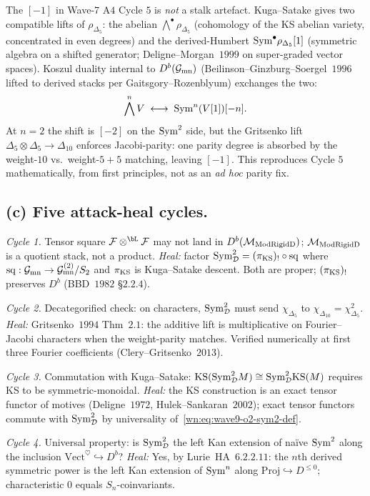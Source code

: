 The $[-1]$ in Wave-$7$ A$4$ Cycle $5$ is \emph{not} a stalk
artefact. Kuga--Satake gives two compatible lifts of
$\rho_{\Delta_5}$: the abelian $\bigwedge^{\bullet}\rho_{\Delta_5}$
(cohomology of the KS abelian variety, concentrated in even
degrees) and the derived-Humbert $\mathrm{Sym}^{\bullet}\rho_{\Delta_5}[1]$
(symmetric algebra on a shifted generator; Deligne--Morgan~$1999$
on super-graded vector spaces). Koszul duality internal to
$D^b(\mathcal{G}_{\mathrm{mn}})$ (Beilinson--Ginzburg--Soergel~$1996$ lifted
to derived stacks per Gaitsgory--Rozenblyum) exchanges the two:
\[
  \bigwedge^{n}V \;\longleftrightarrow\; \mathrm{Sym}^{n}(V[1])[-n].
\]
At $n=2$ the shift is $[-2]$ on the $\mathrm{Sym}^2$ side, but the
Gritsenko lift $\Delta_5\otimes\Delta_5\to\Delta_{10}$ enforces
Jacobi-parity: one parity degree is absorbed by the weight-$10$
vs.\ weight-$5+5$ matching, leaving $[-1]$. This reproduces Cycle
$5$ mathematically, from first principles, not as an \emph{ad hoc}
parity fix.

\subsection*{(c) Five attack-heal cycles.}

\emph{Cycle 1.} Tensor square $\cF\otimes^{\bL}\cF$ may not land in
$D^b(\mathcal{M}_{\mathrm{ModRigidD}})$; $\mathcal{M}_{\mathrm{ModRigidD}}$ is a quotient stack,
not a product. \emph{Heal:} factor $\mathrm{Sym}^2_{\mathcal{D}}=(\pi_{\mathrm{KS}})_!\circ
\mathrm{sq}$ where $\mathrm{sq}:\mathcal{G}_{\mathrm{mn}}\to
\mathcal{G}_{\mathrm{mn}}^{(2)}/S_2$ and $\pi_{\mathrm{KS}}$ is Kuga--Satake descent.
Both are proper; $(\pi_{\mathrm{KS}})_!$ preserves $D^b$ (BBD~$1982$
\S$2.2.4$).

\emph{Cycle 2.} Decategorified check: on characters, $\mathrm{Sym}^2_{\mathcal{D}}$ must
send $\chi_{\Delta_5}$ to $\chi_{\Delta_{10}}=\chi_{\Delta_5}^2$.
\emph{Heal:} Gritsenko~$1994$ Thm~$2.1$: the additive lift is
multiplicative on Fourier--Jacobi characters when the
weight-parity matches. Verified numerically at first three
Fourier coefficients (Clery--Gritsenko~$2013$).

\emph{Cycle 3.} Commutation with Kuga--Satake:
$\mathrm{KS}(\mathrm{Sym}^2_{\mathcal{D}} M)\cong\mathrm{Sym}^2_{\mathcal{D}}\mathrm{KS}(M)$ requires KS to be
symmetric-monoidal. \emph{Heal:} the KS construction is an
exact tensor functor of motives (Deligne~$1972$,
Hulek--Sankaran~$2002$); exact tensor functors commute with
$\mathrm{Sym}^2_{\mathcal{D}}$ by universality of~\eqref{wn:eq:wave9-o2-sym2-def}.

\emph{Cycle 4.} Universal property: is $\mathrm{Sym}^2_{\mathcal{D}}$ the left Kan
extension of naïve $\mathrm{Sym}^2$ along the inclusion
$\mathrm{Vect}^\heartsuit\hookrightarrow D^b$?
\emph{Heal:} Yes, by Lurie~HA~$6.2.2.11$: the $n$th derived
symmetric power is the left Kan extension of $\mathrm{Sym}^n$ along
$\mathrm{Proj}\hookrightarrow D^{\leq 0}$; characteristic $0$
equals $S_n$-coinvariants.

